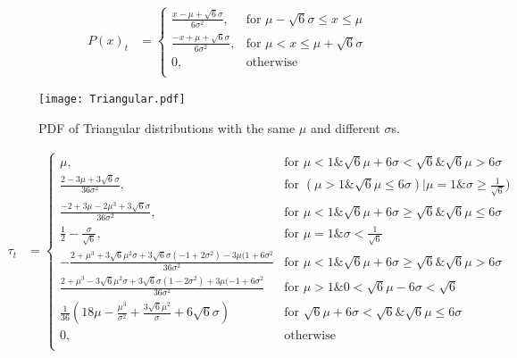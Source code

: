 \begin{align}
P(x)_{t} &=  \left\{
\begin{array}{ll}
    \frac{x-\mu + \sqrt{6} \sigma}{6\sigma^2}, &  \textrm{for   } \mu-\sqrt{6}\sigma \leq x \leq \mu\\
     \frac{-x+\mu + \sqrt{6} \sigma}{6\sigma^2}, &  \textrm{for   } \mu < x \leq \mu+ \sqrt{6}\sigma\\
     0, & \textrm{otherwise}\\
\end{array} 
\right.
\end{align}

\begin{figure}
\begin{center}
	\texttt{[image: Triangular.pdf]}
\end{center}
\vspace{-1em}
\caption{\label{fig:pdfTri}
PDF of Triangular distributions with the same $\mu$ and different $\sigma$s.
}
\vspace{-1em}
\end{figure}

\begin{strip}
\begin{align}
\tau_t &=  \left\{
\begin{array}{ll}
    \mu, &   \textrm{for     }\mu<1 \& \sqrt{6} \mu + 6 \sigma < \sqrt{6} \& \sqrt{6} \mu > 6 \sigma\\
    \frac{2-3\mu+3\sqrt{6}\sigma}{36\sigma^2}, & \textrm{for     } (\mu>1\&\sqrt{6}\mu \leq 6\sigma) | \mu =1 \& \sigma \geq \frac{1}{\sqrt{6}})\\
    \frac{-2+3\mu-2\mu^3+3\sqrt{6}\sigma}{36\sigma^2}, &   \textrm{for     } \mu<1 \& \sqrt{6}\mu+6\sigma\geq \sqrt{6} \& \sqrt{6} \mu \leq 6\sigma\\
    \frac{1}{2}-\frac{\sigma}{\sqrt{6}}, &   \textrm{for     } \mu = 1 \& \sigma < \frac{1}{\sqrt{6}}\\
    -\frac{2+\mu^3+3\sqrt{6}\mu^2\sigma+3\sqrt{6}\sigma(-1+2\sigma^2)-3\mu(1+6\sigma^2}{36\sigma^2} &  \textrm{for     } \mu<1 \& \sqrt{6} \mu + 6 \sigma \geq \sqrt{6} \& \sqrt{6} \mu > 6 \sigma\\
    \frac{2+\mu^3-3\sqrt{6}\mu^2\sigma+3\sqrt{6}\sigma(1-2\sigma^2)+3\mu(-1+6\sigma^2}{36\sigma^2} &  \textrm{for     } \mu>1 \& 0<\sqrt{6}\mu-6\sigma<\sqrt{6}\\
    \frac{1}{36}(18\mu-\frac{\mu^3}{\sigma^2} + \frac{3\sqrt{6}\mu^2}{\sigma}+6\sqrt{6}\sigma) &  \textrm{for     }  \sqrt{6} \mu+6\sigma<\sqrt{6}\&\sqrt{6}\mu\leq 6\sigma\\
     0, &  \textrm{otherwise}\\ 
\end{array} 
\right.
\end{align}
\end{strip}



